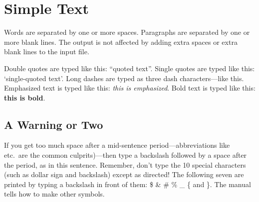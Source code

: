 \documentclass{article}        %
\begin{document}
 
 
\section{Simple Text}          %
 
Words are separated by one or more spaces.  Paragraphs are separated by
one or more blank lines.  The output is not affected by adding extra
spaces or extra blank lines to the input file.
 
Double quotes are typed like this: ``quoted text''.
Single quotes are typed like this: `single-quoted text'.
Long dashes are typed as three dash characters---like this.
Emphasized text is typed like this: \emph{this is emphasized}.
Bold       text is typed like this: \textbf{this is bold}.
\subsection{A Warning or Two}  %
If you get too much space after a mid-sentence period---abbreviations
like etc.\ are the common culprits)---then type a backslash followed by
a space after the period, as in this sentence.
Remember, don't type the 10 special characters (such as dollar sign and
backslash) except as directed!  The following seven are printed by
typing a backslash in front of them:  \$  \&  \#  \%  \_  \{  and  \}.  
The manual tells how to make other symbols.
 
\end{document}
